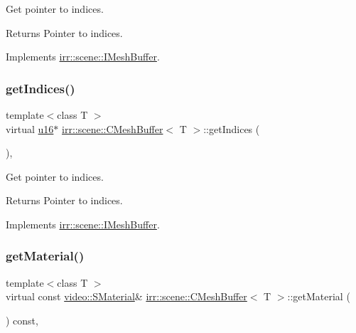Get pointer to indices. 

\begin{DoxyReturn}{Returns}
Pointer to indices. 
\end{DoxyReturn}


Implements \hyperlink{classirr_1_1scene_1_1IMeshBuffer_a76c0013378012af7aeb6cb8f4ea8f9a1}{irr\+::scene\+::\+I\+Mesh\+Buffer}.

\mbox{\label{classirr_1_1scene_1_1CMeshBuffer_a34a85f4868776d4cf312cdece5326c89}} 
\subsubsection{\texorpdfstring{get\+Indices()}{getIndices()}\hspace{0.1cm}{\footnotesize\ttfamily [2/2]}}
{\footnotesize\ttfamily template$<$class T $>$ \\
virtual \hyperlink{namespaceirr_ae9f8ec82692ad3b83c21f555bfa70bcc}{u16}$\ast$ \hyperlink{classirr_1_1scene_1_1CMeshBuffer}{irr\+::scene\+::\+C\+Mesh\+Buffer}$<$ T $>$\+::get\+Indices (\begin{DoxyParamCaption}{ }\end{DoxyParamCaption})\hspace{0.3cm}{\ttfamily [inline]}, {\ttfamily [virtual]}}



Get pointer to indices. 

\begin{DoxyReturn}{Returns}
Pointer to indices. 
\end{DoxyReturn}


Implements \hyperlink{classirr_1_1scene_1_1IMeshBuffer_a3d33a561023314677361e30cf07ae429}{irr\+::scene\+::\+I\+Mesh\+Buffer}.

\mbox{\label{classirr_1_1scene_1_1CMeshBuffer_a3e971800b0fc1a67134f839309589e43}} 
\subsubsection{\texorpdfstring{get\+Material()}{getMaterial()}\hspace{0.1cm}{\footnotesize\ttfamily [1/2]}}
{\footnotesize\ttfamily template$<$class T $>$ \\
virtual const \hyperlink{classirr_1_1video_1_1SMaterial}{video\+::\+S\+Material}\& \hyperlink{classirr_1_1scene_1_1CMeshBuffer}{irr\+::scene\+::\+C\+Mesh\+Buffer}$<$ T $>$\+::get\+Material (\begin{DoxyParamCaption}{ }\end{DoxyParamCaption}) const\hspace{0.3cm}{\ttfamily [inline]}, {\ttfamily [virtual]}}



